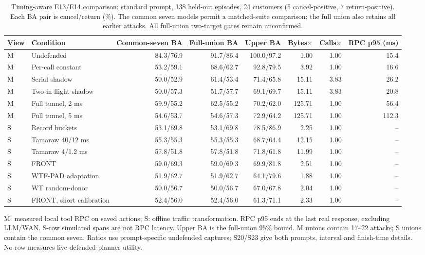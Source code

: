 \begin{table}[t]\centering\footnotesize
\caption{Timing-aware E13/E14 comparison: standard prompt, 138 held-out episodes, 24 customers (5 cancel-positive, 7 return-positive). Each BA pair is cancel/return (\%). The common seven models permit a matched-suite comparison; the full union also retains all earlier attacks. All full-union two-target gates remain unconfirmed.}\label{tab:r7-controls}
\begin{tabular}{@{}llrrrrrr@{}}\toprule
View & Condition & Common-seven BA & Full-union BA & Upper BA & Bytes$\times$ & Calls$\times$ & RPC p95 (ms)\\\midrule
M & Undefended & 84.3/76.9 & 91.7/86.4 & 100.0/97.2 & 1.00 & 1.00 & 15.4\\
M & Per-call constant & 53.2/59.1 & 68.6/62.7 & 92.8/79.5 & 3.92 & 1.00 & 16.6\\
M & Serial shadow & 50.0/52.9 & 61.4/53.4 & 71.4/65.8 & 15.11 & 3.83 & 26.2\\
M & Two-in-flight shadow & 50.0/57.3 & 51.7/57.7 & 69.1/69.7 & 15.11 & 3.83 & 20.8\\
M & Full tunnel, 2 ms & 59.9/55.2 & 62.5/55.2 & 70.2/62.0 & 125.71 & 1.00 & 56.4\\
M & Full tunnel, 5 ms & 54.6/53.7 & 54.6/57.3 & 72.9/64.2 & 125.71 & 1.00 & 112.3\\
S & Record buckets & 53.1/69.8 & 53.1/69.8 & 78.5/86.9 & 2.25 & 1.00 & --\\
S & Tamaraw 40/12 ms & 55.3/55.3 & 55.3/55.3 & 68.7/64.4 & 12.15 & 1.00 & --\\
S & Tamaraw 4/1.2 ms & 57.8/51.8 & 57.8/51.8 & 71.8/61.8 & 11.99 & 1.00 & --\\
S & FRONT & 59.0/69.3 & 59.0/69.3 & 69.9/81.8 & 2.51 & 1.00 & --\\
S & WTF-PAD adaptation & 51.9/62.7 & 51.9/62.7 & 64.1/79.6 & 1.88 & 1.00 & --\\
S & WT random-donor & 50.0/56.7 & 50.0/56.7 & 67.0/67.8 & 2.04 & 1.00 & --\\
S & FRONT, short calibration & 52.4/56.0 & 52.4/56.0 & 61.3/71.1 & 2.33 & 1.00 & --\\
\bottomrule\end{tabular}
\par\smallskip\raggedright M: measured local tool RPC on saved actions; S: offline traffic transformation. RPC p95 ends at the last real response, excluding LLM/WAN. S-row simulated spans are not RPC latency. Upper BA is the full-union 95\% bound. M unions contain 17--22 attacks; S unions contain the common seven. Ratios use prompt-specific undefended captures; S20/S23 give both prompts, interval and finish-time details. No row measures live defended-planner utility.
\end{table}
